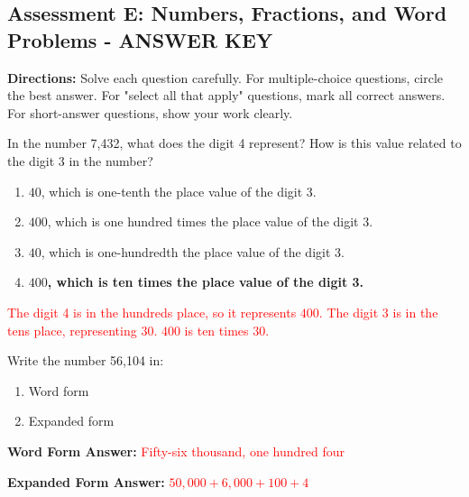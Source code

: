 \documentclass[12pt]{article}
\begin{document}
\subsection*{\small Assessment E: Numbers, Fractions, and Word Problems - ANSWER KEY}
\onehalfspacing

\begin{tcolorbox}[colframe=black!50, colback=white, title=Assessment Directions]
\textbf{Directions:} Solve each question carefully. For multiple-choice questions, circle the best answer. For "select all that apply" questions, mark all correct answers. For short-answer questions, show your work clearly.
\end{tcolorbox}

\begin{tcolorbox}[colframe=black!50, colback=white, title=\textbf{Problem 1 (4.NBT.A.1)}]
In the number 7,432, what does the digit 4 represent? How is this value related to the digit 3 in the number?

\begin{enumerate}[label=(\Alph*)]
    \item \(40\), which is one-tenth the place value of the digit 3.
    \item \(400\), which is one hundred times the place value of the digit 3.
    \item \(40\), which is one-hundredth the place value of the digit 3.
    \item \textbf{\(400\), which is ten times the place value of the digit 3.}
\end{enumerate}

\textcolor{red}{The digit 4 is in the hundreds place, so it represents \(400\). The digit 3 is in the tens place, representing \(30\). \(400\) is ten times \(30\).}
\end{tcolorbox}

\begin{tcolorbox}[colframe=black!50, colback=white, title=\textbf{Problem 2 (4.NBT.A.2)}]
Write the number 56,104 in:
\begin{enumerate}
    \item Word form
    \item Expanded form
\end{enumerate}

\textbf{Word Form Answer:}  
\textcolor{red}{Fifty-six thousand, one hundred four}

\textbf{Expanded Form Answer:}  
\textcolor{red}{\(50,000 + 6,000 + 100 + 4\)}
\end{tcolorbox}
\end{document}
